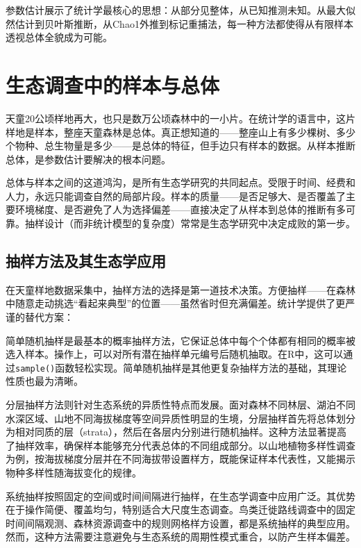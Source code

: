 \documentclass[
  twoside,12pt,fontset=none]{ctexbook}
\begin{document}
参数估计展示了统计学最核心的思想：从部分见整体，从已知推测未知。从最大似然估计到贝叶斯推断，从Chao1外推到标记重捕法，每一种方法都使得从有限样本透视总体全貌成为可能。

\hypertarget{ux751fux6001ux8c03ux67e5ux4e2dux7684ux6837ux672cux4e0eux603bux4f53}{%
\section{生态调查中的样本与总体}\label{ux751fux6001ux8c03ux67e5ux4e2dux7684ux6837ux672cux4e0eux603bux4f53}}

天童20公顷样地再大，也只是数万公顷森林中的一小片。在统计学的语言中，这片样地是样本，整座天童森林是总体。真正想知道的------整座山上有多少棵树、多少个物种、总生物量是多少------是总体的特征，但手边只有样本的数据。从样本推断总体，是参数估计要解决的根本问题。

总体与样本之间的这道鸿沟，是所有生态学研究的共同起点。受限于时间、经费和人力，永远只能调查自然的局部片段。样本的质量------是否足够大、是否覆盖了主要环境梯度、是否避免了人为选择偏差------直接决定了从样本到总体的推断有多可靠。抽样设计（而非统计模型的复杂度）常常是生态学研究中决定成败的第一步。

\hypertarget{ux62bdux6837ux65b9ux6cd5ux53caux5176ux751fux6001ux5b66ux5e94ux7528}{%
\subsection{抽样方法及其生态学应用}\label{ux62bdux6837ux65b9ux6cd5ux53caux5176ux751fux6001ux5b66ux5e94ux7528}}

在天童样地数据采集中，抽样方法的选择是第一道技术决策。方便抽样------在森林中随意走动挑选``看起来典型''的位置------虽然省时但充满偏差。统计学提供了更严谨的替代方案：

简单随机抽样是最基本的概率抽样方法，它保证总体中每个个体都有相同的概率被选入样本。操作上，可以对所有潜在抽样单元编号后随机抽取。在R中，这可以通过\texttt{sample()}函数轻松实现。简单随机抽样是其他更复杂抽样方法的基础，其理论性质也最为清晰。

分层抽样方法则针对生态系统的异质性特点而发展。面对森林不同林层、湖泊不同水深区域、山地不同海拔梯度等空间异质性明显的生境，分层抽样首先将总体划分为相对同质的层（strata），然后在各层内分别进行随机抽样。这种方法显著提高了抽样效率，确保样本能够充分代表总体的不同组成部分。以山地植物多样性调查为例，按海拔梯度分层并在不同海拔带设置样方，既能保证样本代表性，又能揭示物种多样性随海拔变化的规律。

系统抽样按照固定的空间或时间间隔进行抽样，在生态学调查中应用广泛。其优势在于操作简便、覆盖均匀，特别适合大尺度生态调查。鸟类迁徙路线调查中的固定时间间隔观测、森林资源调查中的规则网格样方设置，都是系统抽样的典型应用。然而，这种方法需要注意避免与生态系统的周期性模式重合，以防产生样本偏差。
\end{document}
